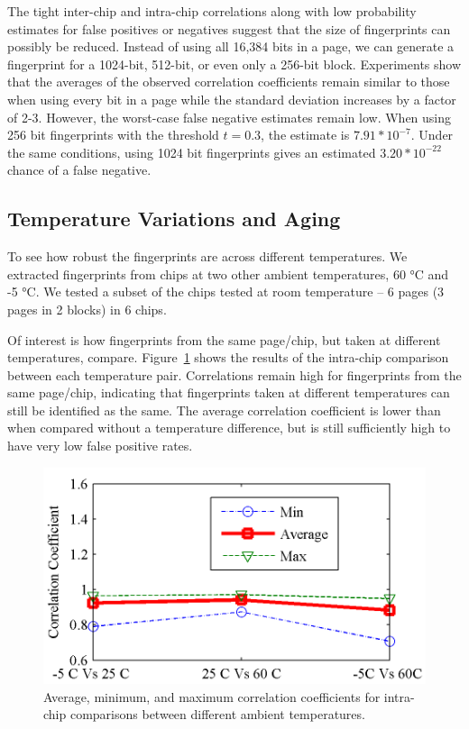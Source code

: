 The tight inter-chip and intra-chip correlations along with low probability estimates for false positives or negatives suggest that the size of fingerprints can possibly be reduced. Instead of using all 16,384 bits in a page, we can generate a fingerprint for a 1024-bit, 512-bit, or even only a 256-bit block. Experiments show that the averages of the observed correlation coefficients remain similar to those when using every bit in a page while the standard deviation increases by a factor of 2-3. However, the worst-case false negative estimates remain low. When using 256 bit fingerprints with the threshold $t = 0.3$, the estimate is $7.91*10^{-7}$. Under the same conditions, using 1024 bit fingerprints gives an estimated $3.20*10^{-22}$ chance of a false negative.

\subsection{Temperature Variations and Aging}

To see how robust the fingerprints are across different temperatures. We extracted fingerprints from chips at two other ambient temperatures, 60 °C and -5 °C. We tested a subset of the chips tested at room temperature – 6 pages (3 pages in 2 blocks) in 6 chips. 

Of interest is how fingerprints from the same page/chip, but taken at different temperatures, compare. Figure~\ref{fig:fprints_temp} shows the results of the intra-chip comparison between each temperature pair. Correlations remain high for fingerprints from the same page/chip, indicating that fingerprints taken at different temperatures can still be identified as the same. The average correlation coefficient is lower than when compared without a temperature difference, but is still sufficiently high to have very low false positive rates.

\begin{figure}
\begin{center} 
\includegraphics[width=\mywidth]{figs/fprints_temp.png} 
\caption{Average, minimum, and maximum correlation coefficients for intra-chip comparisons between different ambient temperatures.}
\label{fig:fprints_temp} 
\vspace{-0.1in}
\end{center} 
\end{figure} 

